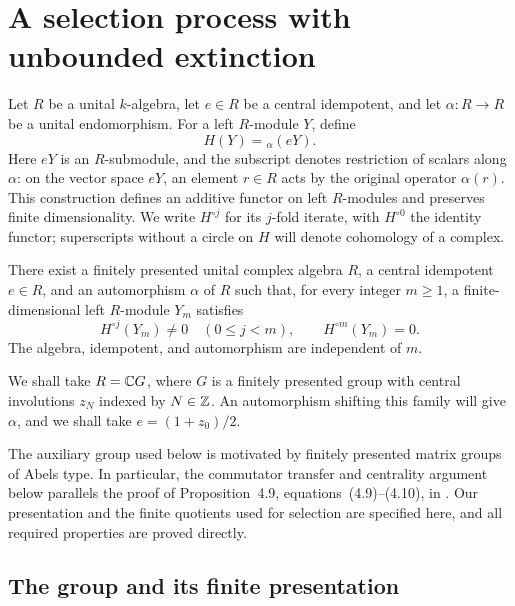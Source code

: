 \section{A selection process with unbounded extinction}
\label{sec:selection}

Let $R$ be a unital $k$-algebra, let $e\in R$ be a central idempotent,
and let $\alpha:R\to R$ be a unital endomorphism.  For a left
$R$-module $Y$, define
\begin{equation}
  H(Y)={}_{\alpha}(eY).
  \label{eq:selection-functor}
\end{equation}
Here $eY$ is an $R$-submodule, and the subscript denotes restriction of
scalars along $\alpha$: on the vector space $eY$, an element $r\in R$
acts by the original operator $\alpha(r)$.  This construction defines an
additive functor on left $R$-modules and preserves finite dimensionality.
We write $H^{\circ j}$ for its $j$-fold iterate, with
$H^{\circ 0}$ the identity functor; superscripts without a circle on
$H$ will denote cohomology of a complex.

\begin{proposition}
\label{prop:selection}
There exist a finitely presented unital complex algebra $R$, a central
idempotent $e\in R$, and an automorphism $\alpha$ of $R$ such that, for
every integer $m\geq 1$, a finite-dimensional left $R$-module $Y_m$
satisfies
\begin{equation}
  H^{\circ j}(Y_m)\neq 0\quad(0\leq j<m),
  \qquad H^{\circ m}(Y_m)=0.
  \label{eq:extinction}
\end{equation}
The algebra, idempotent, and automorphism are independent of $m$.
\end{proposition}

We shall take $R=\mathbb C G$, where $G$ is a finitely presented group with
central involutions $z_N$ indexed by $N\in\mathbb Z$. An automorphism shifting
this family will give $\alpha$, and we shall take $e=(1+z_0)/2$.

The auxiliary group used below is motivated by finitely presented
matrix groups of Abels type. In particular, the commutator transfer
and centrality argument below parallels the proof of Proposition~4.9,
equations~(4.9)--(4.10), in \cite{Rego2022}. Our presentation and the
finite quotients used for selection are specified here, and all required
properties are proved directly.

\subsection{The group and its finite presentation}

